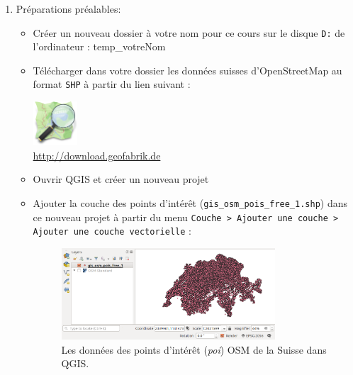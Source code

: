 \documentclass[11pt]{article}
\begin{document}
\begin{enumerate}\itemsep0.4em
\item Préparations préalables:
\begin{itemize}\itemsep0.2em
\renewcommand\labelitemi{\---}
\item Créer un nouveau dossier à votre nom pour ce cours sur le disque \texttt{D:} de l'ordinateur : \og{}temp\_votreNom\fg{}
\item Télécharger dans votre dossier les données suisses d'OpenStreetMap au format \texttt{SHP} à partir du lien suivant : 
\vspace*{-0.4em}
\begin{center}
\includegraphics[width=1.64cm]{osm.png}\\
\url{http://download.geofabrik.de}
\end{center}
\vspace*{0.4em}

\item Ouvrir QGIS et créer un nouveau projet
\item Ajouter la couche des points d'intérêt (\og{}\texttt{gis\_osm\_pois\_free\_1.shp}\fg{}) dans ce nouveau projet à partir du menu \og{}\texttt{Couche > Ajouter une couche > Ajouter une couche vectorielle}\fg{} : 

\vspace*{-0.4em}
\begin{figure}[H]
\centering
\includegraphics[width=0.8\textwidth]{osm_data.png}
\vspace*{-0.64em}
\caption{Les données des points d'intérêt (\emph{poi}) OSM de la Suisse dans QGIS.}
\label{osmdata}
\end{figure}
\vspace*{0.4em}


\end{itemize}
\end{enumerate}
\end{document}
